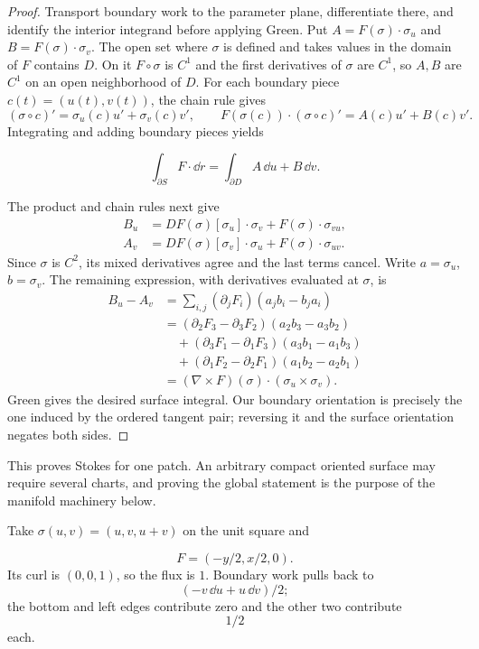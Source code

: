 \begin{proof}
Transport boundary work to the parameter plane, differentiate there,
and identify the interior integrand before applying Green. Put
$A=F(\sigma)\cdot\sigma_u$ and $B=F(\sigma)\cdot\sigma_v$.
The open set where $\sigma$ is defined and takes values in the domain of
$F$ contains $D$. On it $F\circ\sigma$ is $C^1$ and the first derivatives
of $\sigma$ are $C^1$, so $A,B$ are $C^1$ on an open neighborhood of $D$.
For each boundary piece $c(t)=(u(t),v(t))$, the chain rule gives
\[
(\sigma\circ c)'=\sigma_u(c)u'+\sigma_v(c)v',\qquad
F(\sigma(c))\cdot(\sigma\circ c)'=A(c)u'+B(c)v'.
\]
Integrating and adding boundary pieces yields

\[
\int_{\partial S}F\cdot\dd r=\int_{\partial D}A\,\dd u+B\,\dd v.
\]

The product and chain rules next give
\[
\begin{aligned}
B_u&=DF(\sigma)[\sigma_u]\cdot\sigma_v+F(\sigma)\cdot\sigma_{vu},\\
A_v&=DF(\sigma)[\sigma_v]\cdot\sigma_u+F(\sigma)\cdot\sigma_{uv}.
\end{aligned}
\]
Since $\sigma$ is $C^2$, its mixed derivatives agree and the last terms
cancel. Write $a=\sigma_u$, $b=\sigma_v$. The remaining expression, with
derivatives evaluated at $\sigma$, is
\[
\begin{split}
B_u-A_v
&=\sum_{i,j}(\partial_jF_i)(a_jb_i-b_ja_i)\\
&=(\partial_2F_3-\partial_3F_2)(a_2b_3-a_3b_2)\\
&\quad+(\partial_3F_1-\partial_1F_3)(a_3b_1-a_1b_3)\\
&\quad+(\partial_1F_2-\partial_2F_1)(a_1b_2-a_2b_1)\\
&=(\nabla\times F)(\sigma)\cdot(\sigma_u\times\sigma_v).
\end{split}
\]
Green gives the desired surface integral. Our boundary orientation is
precisely the one induced by the ordered tangent pair; reversing it and the
surface orientation negates both sides.
\end{proof}
This proves Stokes for one patch. An arbitrary compact oriented surface
may require several charts, and proving the global statement is the purpose
of the manifold machinery below.

\begin{example}
Take $\sigma(u,v)=(u,v,u+v)$ on the unit square and

\[
F=(-y/2,x/2,0).
\]
 Its curl is $(0,0,1)$, so the flux is $1$.
Boundary work pulls back to
\[
(-v\,\dd u+u\,\dd v)/2;
\]
 the bottom and
left edges contribute zero and the other two contribute
\[
1/2
\]
 each.
\end{example}

